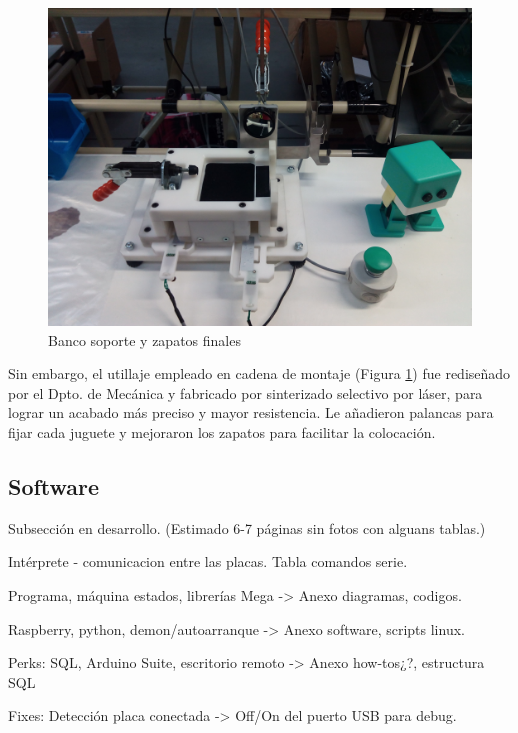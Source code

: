 \begin{figure}
\centering
\includegraphics[width=120mm]{Figures/bancoFabrica}
\caption{Banco soporte y zapatos finales}
\label{fig:bancoFabrica}
\end{figure}

Sin embargo, el utillaje empleado en cadena de montaje (Figura \ref{fig:bancoFabrica}) fue rediseñado por el Dpto. de Mecánica y fabricado por sinterizado selectivo por láser, para lograr un acabado más preciso y mayor resistencia. Le añadieron palancas para fijar cada juguete y mejoraron los zapatos para facilitar la colocación.


\subsection{Software}
\label{subsec:Software}

Subsección en desarrollo. (Estimado 6-7 páginas sin fotos con alguans tablas.)

Intérprete - comunicacion entre las placas. Tabla comandos serie.

Programa, máquina estados, librerías Mega -> Anexo diagramas, codigos.

Raspberry, python, demon/autoarranque -> Anexo software, scripts linux.

Perks: SQL, Arduino Suite, escritorio remoto -> Anexo how-tos¿?, estructura SQL

Fixes: Detección placa conectada -> Off/On del puerto USB para debug.
